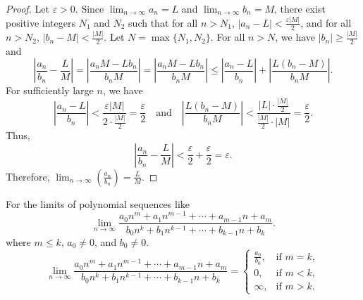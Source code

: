 \begin{proof}
Let $\varepsilon > 0$. Since $\lim_{n \to \infty} a_n = L$ and $\lim_{n \to \infty} b_n = M$, there exist positive integers $N_1$ and $N_2$ such that for all $n > N_1$, $|a_n - L| < \frac{\varepsilon |M|}{2}$, and for all $n > N_2$, $|b_n - M| < \frac{|M|}{2}$. Let $N = \max\{N_1, N_2\}$. For all $n > N$, we have $|b_n| \geq \frac{|M|}{2}$ and
\[
\left|\frac{a_n}{b_n} - \frac{L}{M}\right| = \left|\frac{a_n M - L b_n}{b_n M}\right| = \left|\frac{a_n M - L b_n}{b_n M}\right| \leq \left|\frac{a_n - L}{b_n}\right| + \left|\frac{L(b_n - M)}{b_n M}\right|.
\]
For sufficiently large $n$, we have
\[
\left|\frac{a_n - L}{b_n}\right| < \frac{\varepsilon |M|}{2 \cdot \frac{|M|}{2}} = \frac{\varepsilon}{2} \quad \text{and} \quad \left|\frac{L (b_n - M)}{b_n M}\right| < \frac{|L| \cdot \frac{|M|}{2}}{\frac{|M|}{2} \cdot |M|} = \frac{\varepsilon}{2}.
\]
Thus,
\[
\left|\frac{a_n}{b_n} - \frac{L}{M}\right| < \frac{\varepsilon}{2} + \frac{\varepsilon}{2} = \varepsilon.
\]
Therefore, $\lim_{n \to \infty} \left(\frac{a_n}{b_n}\right) = \frac{L}{M}$.
\end{proof}
%
\begin{corollary}
For the limits of polynomial sequences like
\[
\lim_{n \to \infty} \frac{a_0 n^m + a_1 n^{m-1} + \cdots + a_{m-1} n + a_m}{b_0 n^k + b_1 n^{k-1} + \cdots + b_{k-1} n + b_k}.
\]
where \(m \leq k\), \(a_0 \neq 0\), and \(b_0 \neq 0\).
\[
\lim_{n \to \infty} \frac{a_0 n^m + a_1 n^{m-1} + \cdots + a_{m-1} n + a_m}{b_0 n^k + b_1 n^{k-1} + \cdots + b_{k-1} n + b_k} = 
\begin{cases} 
\frac{a_0}{b_0}, & \text{if } m = k, \\
0, & \text{if } m < k, \\
\infty, & \text{if } m > k.
\end{cases}
\]
\end{corollary}
